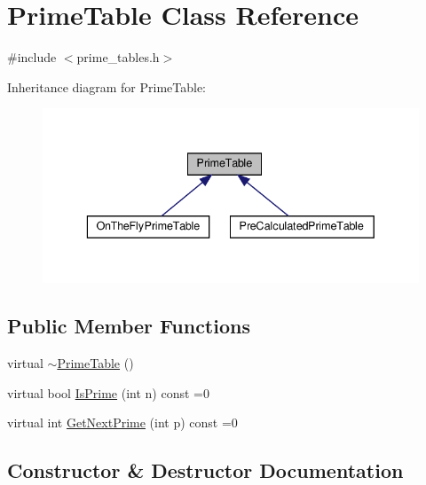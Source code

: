 \hypertarget{classPrimeTable}{}\section{Prime\+Table Class Reference}
\label{classPrimeTable}


{\ttfamily \#include $<$prime\+\_\+tables.\+h$>$}



Inheritance diagram for Prime\+Table\+:\nopagebreak
\begin{figure}[H]
\begin{center}
\leavevmode
\includegraphics[width=336pt]{classPrimeTable__inherit__graph}
\end{center}
\end{figure}
\subsection*{Public Member Functions}
\begin{DoxyCompactItemize}
\item 
virtual \hyperlink{classPrimeTable_af2cdea4896fd86a42b4dfd5e5027d640}{$\sim$\+Prime\+Table} ()
\item 
virtual bool \hyperlink{classPrimeTable_a2ab9243364ded0c51541f641b2df362a}{Is\+Prime} (int n) const =0
\item 
virtual int \hyperlink{classPrimeTable_ae537c939f56617d8937d57bbbae3ab30}{Get\+Next\+Prime} (int p) const =0
\end{DoxyCompactItemize}


\subsection{Constructor \& Destructor Documentation}
\mbox{\label{classPrimeTable_af2cdea4896fd86a42b4dfd5e5027d640}} 
